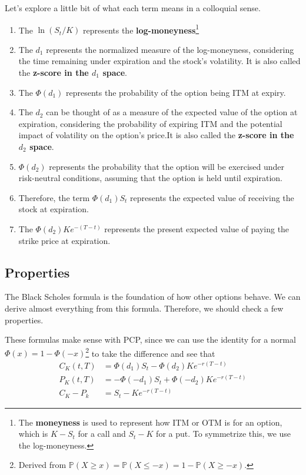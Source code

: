 \documentclass{article}
\begin{document}
    Let's explore a little bit of what each term means in a colloquial sense. 

    \begin{enumerate}
      \item The $\ln(S_t /K)$ represents the \textbf{log-moneyness}\footnote{The \textbf{moneyness} is used to represent how ITM or OTM is for an option, which is $K - S_t$ for a call and $S_t - K$ for a put. To symmetrize this, we use the log-moneyness.} 

      \item The $d_1$ represents the normalized measure of the log-moneyness, considering the time remaining under expiration and the stock's volatility. It is also called the \textbf{z-score in the $d_1$ space}. 

      \item The $\Phi(d_1)$ represents the probability of the option being ITM at expiry. 

      \item The $d_2$ can be thought of as a measure of the expected value of the option at expiration, considering the probability of expiring ITM and the potential impact of volatility on the option's price.It is also called the \textbf{z-score in the $d_2$ space}. 

      \item $\Phi(d_2)$ represents the probability that the option will be exercised under risk-neutral conditions, assuming that the option is held until expiration. 

      \item Therefore, the term $\Phi(d_1) S_t$ represents the expected value of receiving the stock at expiration.  

      \item The $\Phi(d_2) K e^{-(T - t)}$ represents the present expected value of paying the strike price at expiration. 
    \end{enumerate}

  \subsection{Properties}

    The Black Scholes formula is the foundation of how other options behave. We can derive almost everything from this formula. Therefore, we should check a few properties. 

    \begin{theorem}[PCP]
      \label{thm:pcp}
      These formulas make sense with PCP, since we can use the identity for a normal $\Phi(x) = 1 - \Phi(-x)$\footnote{Derived from $\mathbb{P}(X \geq x) = \mathbb{P}(X \leq -x) = 1 - \mathbb{P}(X \geq -x)$.} to take the difference and see that 
      \begin{align*}
        C_K (t, T) & = \Phi(d_1) S_t - \Phi (d_2) K e^{-r (T - t)} \\ 
        P_K (t, T) & = -\Phi(-d_1) S_t + \Phi (-d_2) K e^{-r (T - t)} \\
        C_K  - P_k & = S_t - K e^{-r (T - t)}
      \end{align*}
    \end{theorem}
\end{document}
